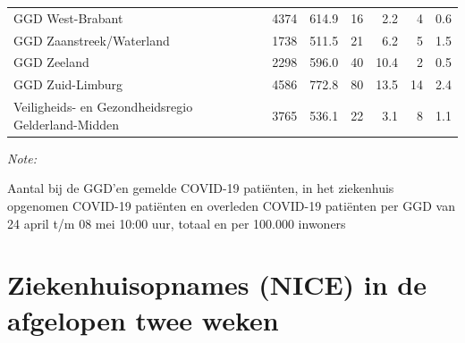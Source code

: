\documentclass[
  english,
  man,floatsintext]{apa6}
\begin{document}
\begin{table}
\begin{threeparttable}
\begin{tabular}{lrrrrrr}
GGD West-Brabant & 4374 & 614.9 & 16 & 2.2 & 4 & 0.6\\
GGD Zaanstreek/Waterland & 1738 & 511.5 & 21 & 6.2 & 5 & 1.5\\
GGD Zeeland & 2298 & 596.0 & 40 & 10.4 & 2 & 0.5\\
GGD Zuid-Limburg & 4586 & 772.8 & 80 & 13.5 & 14 & 2.4\\
Veiligheids- en Gezondheidsregio Gelderland-Midden & 3765 & 536.1 & 22 & 3.1 & 8 & 1.1\\
\bottomrule
\end{tabular}
\begin{tablenotes}
\item \textit{Note: } 
\item Aantal bij de GGD’en gemelde COVID-19 patiënten, in het ziekenhuis opgenomen COVID-19 patiënten en overleden COVID-19 patiënten per GGD van 24 april t/m 08 mei 10:00 uur, totaal en per 100.000 inwoners
\end{tablenotes}
\end{threeparttable}
\endgroup{}
\end{table}

\newpage

\hypertarget{ziekenhuisopnames-nice-in-de-afgelopen-twee-weken}{%
\section{Ziekenhuisopnames (NICE) in de afgelopen twee weken}\label{ziekenhuisopnames-nice-in-de-afgelopen-twee-weken}}
\end{document}
